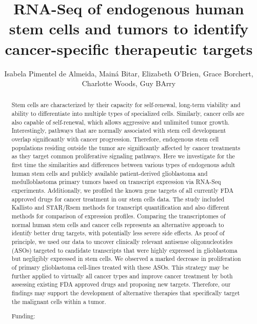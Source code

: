 \documentclass[twoside]{article}
\title{\vspace{-15mm}\fontsize{24pt}{10pt}\selectfont\textbf{ RNA-Seq of endogenous human stem cells and tumors to identify cancer-specific therapeutic targets }} %
\author{ Isabela Pimentel de Almeida, Main\'a Bitar, Elizabeth O'Brien, Grace Borchert, Charlotte Woods, Guy BArry }
\affil{ Universidade de S\~ao Paulo }
\date{}
\begin{document}
  
  
  \maketitle %
  
  
  \thispagestyle{fancy} %
  
  
  \begin{abstract}
  Stem cells are characterized by their capacity for self-renewal,  long-term viability and ability to differentiate into multiple types of specialized cells. Similarly,  cancer cells are also capable of self-renewal,  which allows aggressive and unlimited tumor growth. Interestingly,  pathways that are normally associated with stem cell development overlap significantly with cancer progression. Therefore,  endogenous stem cell populations residing outside the tumor are significantly affected by cancer treatments as they target common proliferative signaling pathways. Here we investigate for the first time the similarities and differences between various types of endogenous adult human stem cells and publicly available patient-derived glioblastoma and medulloblastoma primary tumors based on transcript expression via RNA-Seq experiments. Additionally,  we profiled the known gene targets of all currently FDA approved drugs for cancer treatment in our stem cells data. The study included Kallisto and STAR/Rsem methods for transcript quantification and also different methods for comparison of expression profiles. Comparing the transcriptomes of normal human stem cells and cancer cells represents an alternative approach to identify better drug targets,  with potentially less severe side effects. As proof of principle,  we used our data to uncover clinically relevant antisense oligonucleotides (ASOs) targeted to candidate transcripts that were highly expressed in glioblastoma but negligibly expressed in stem cells. We observed a marked decrease in proliferation of primary glioblastoma cell-lines treated with these ASOs. This strategy may be further applied to virtually all cancer types and improve cancer treatment by both assessing existing FDA approved drugs and proposing new targets.  Therefore,  our findings may support the development of alternative therapies that specifically target the malignant cells within a tumor.
  
  Funding:  \\ 
  \end{abstract}
  
\end{document}
